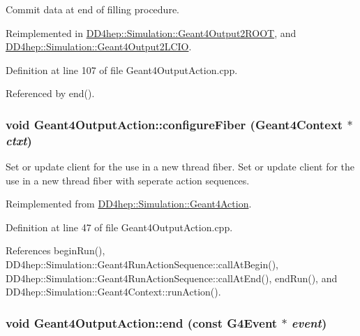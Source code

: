 Commit data at end of filling procedure. 

Reimplemented in \hyperlink{class_d_d4hep_1_1_simulation_1_1_geant4_output2_r_o_o_t_a06090a17c7d266dcdfb7b2b180aeaffe}{DD4hep::Simulation::Geant4Output2ROOT}, and \hyperlink{class_d_d4hep_1_1_simulation_1_1_geant4_output2_l_c_i_o_a86575064911453b387f237077fa8a969}{DD4hep::Simulation::Geant4Output2LCIO}.

Definition at line 107 of file Geant4OutputAction.cpp.

Referenced by end().\hypertarget{class_d_d4hep_1_1_simulation_1_1_geant4_output_action_abc1171027ea0a21fedef2d49a14ec557}{
\subsubsection[{configureFiber}]{\setlength{\rightskip}{0pt plus 5cm}void Geant4OutputAction::configureFiber ({\bf Geant4Context} $\ast$ {\em ctxt})}}
\label{class_d_d4hep_1_1_simulation_1_1_geant4_output_action_abc1171027ea0a21fedef2d49a14ec557}


Set or update client for the use in a new thread fiber. Set or update client for the use in a new thread fiber with seperate action sequences. 

Reimplemented from \hyperlink{class_d_d4hep_1_1_simulation_1_1_geant4_action_a6adc7138508303e4e417cb48a737ab19}{DD4hep::Simulation::Geant4Action}.

Definition at line 47 of file Geant4OutputAction.cpp.

References beginRun(), DD4hep::Simulation::Geant4RunActionSequence::callAtBegin(), DD4hep::Simulation::Geant4RunActionSequence::callAtEnd(), endRun(), and DD4hep::Simulation::Geant4Context::runAction().\hypertarget{class_d_d4hep_1_1_simulation_1_1_geant4_output_action_a6fa4e933973a42a00b7be10292619780}{
\subsubsection[{end}]{\setlength{\rightskip}{0pt plus 5cm}void Geant4OutputAction::end (const G4Event $\ast$ {\em event})}}
\label{class_d_d4hep_1_1_simulation_1_1_geant4_output_action_a6fa4e933973a42a00b7be10292619780}


